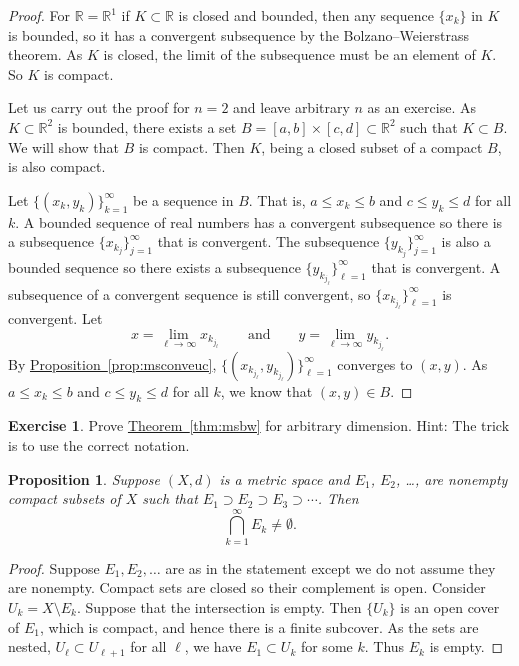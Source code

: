 \documentclass[12pt,openany]{book}
\newcommand{\R}{{\mathbb{R}}}
\theoremstyle{plain}
\newtheorem{prop}[thm]{Proposition}
\theoremstyle{remark}
\theoremstyle{definition}
\newenvironment{exbox}{%
    \def\FrameCommand{\vrule width 1pt \relax\hspace{10pt}}%
    \MakeFramed{\advance\hsize-\width\FrameRestore}%
}{%
    \endMakeFramed
}
\theoremstyle{exercise}
\newtheorem{exercise}{Exercise}[section]
\theoremstyle{example}
\newcommand{\thmref}[1]{\hyperref[#1]{Theorem~\ref*{#1}}}
\newcommand{\propref}[1]{\hyperref[#1]{Proposition~\ref*{#1}}}
\begin{document}
\begin{proof}
For $\R = \R^1$ if $K \subset \R$ is closed and bounded, then
any sequence $\{ x_k \}$ in $K$ is bounded, so it has a convergent
subsequence by
the Bolzano--Weierstrass theorem.
As $K$ is closed, the limit of the subsequence must be an element of
$K$.  So $K$ is compact.

Let us carry out the proof for $n=2$ and leave arbitrary $n$ as an exercise.
As $K \subset \R^2$ is bounded, there exists a set
$B=[a,b]\times[c,d] \subset \R^2$ such that $K \subset B$.  We will show
that $B$ is compact.  Then $K$, being a closed subset of a compact $B$, is
also compact.  

Let $\bigl\{ (x_k,y_k) \bigr\}_{k=1}^\infty$ be a sequence in $B$.  That is,
$a \leq x_k \leq b$ and
$c \leq y_k \leq d$ for all $k$.  A bounded sequence of real numbers
has a convergent
subsequence so there is a subsequence $\{ x_{k_j} \}_{j=1}^\infty$
that is convergent.  The subsequence 
$\{ y_{k_j} \}_{j=1}^\infty$ is also a bounded sequence so there exists
a subsequence
$\{ y_{k_{j_\ell}} \}_{\ell=1}^\infty$ that is convergent.  A subsequence of a
convergent sequence is still convergent, so 
$\{ x_{k_{j_\ell}} \}_{\ell=1}^\infty$ is convergent.
Let
\begin{equation*}
x = \lim_{\ell\to\infty} x_{k_{j_\ell}}
\qquad \text{and} \qquad
y = \lim_{\ell\to\infty} y_{k_{j_\ell}} .
\end{equation*}
By \propref{prop:msconveuc},
$\bigl\{ (x_{k_{j_\ell}},y_{k_{j_\ell}}) \bigr\}_{\ell=1}^\infty$ converges to $(x,y)$.
As $a \leq x_k \leq b$ and
$c \leq y_k \leq d$ for all $k$, we know that $(x,y) \in B$.
\end{proof}

\begin{exbox}
\begin{exercise}
Prove \thmref{thm:msbw} for arbitrary dimension.
Hint: The trick is to use the correct notation.
\end{exercise}
\end{exbox}

\begin{prop}
Suppose $(X,d)$ is a metric space
and $E_1$, $E_2$, \ldots, are
nonempty compact subsets of $X$ such that
$E_1 \supset E_2 \supset E_3 \supset \cdots$.  Then
\begin{equation*}
\bigcap_{k=1}^\infty E_k \not= \emptyset .
\end{equation*}
\end{prop}

\begin{proof}
Suppose $E_1,E_2,\ldots$ are as in the statement except we do not
assume they are nonempty.
Compact sets are closed so their complement is open.  Consider
$U_k = X \setminus E_k$.  Suppose that the intersection is empty.
Then $\{ U_k \}$ is an open cover of $E_1$, which is compact,
and hence there is a finite subcover.
As the sets are nested,
$U_\ell \subset U_{\ell+1}$ for all $\ell$,
we have $E_1 \subset U_k$ for some $k$.   Thus $E_k$ is empty.
\end{proof}
\end{document}
